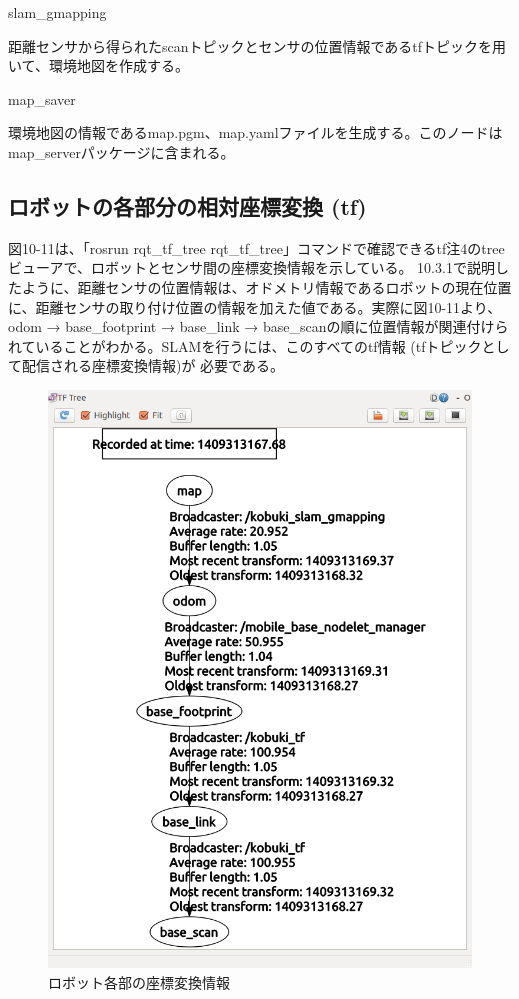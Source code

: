 \circled{\thenum} slam\_gmapping

距離センサから得られたscanトピックとセンサの位置情報であるtfトピックを用いて、環境地図を作成する。

\circled{\thenum} map\_saver

環境地図の情報であるmap.pgm、map.yamlファイルを生成する。このノードはmap\_serverパッケージに含まれる。

\subsection{ロボットの各部分の相対座標変換 (tf)}

図10-11は、「rosrun rqt\_tf\_tree rqt\_tf\_tree」コマンドで確認できるtf注4のtreeビューアで、ロボットとセンサ間の座標変換情報を示している。
10.3.1で説明したように、距離センサの位置情報は、オドメトリ情報であるロボットの現在位置に、距離センサの取り付け位置の情報を加えた値である。実際に図10-11より、odom → base\_footprint → base\_link → base\_scanの順に位置情報が関連付けられていることがわかる。SLAMを行うには、このすべてのtf情報 (tfトピックとして配信される座標変換情報)が  必要である。

\begin{figure}[ht]
  \centering
  \includegraphics[width=\columnwidth]{pictures/chapter10/pic_10_11.png}
  \caption{ロボット各部の座標変換情報}
\end{figure}


